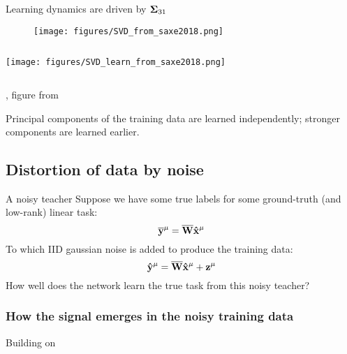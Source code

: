 \documentclass{beamer}
\newcommand{\bb}[1]{{\bf\overline{#1}}}
\newcommand{\bh}[1]{{\bf\hat{#1}}}
\begin{document}
\begin{frame}{Learning dynamics are driven by ${\bf\Sigma}_{31}$}
\begin{figure}
\centering
\texttt{[image: figures/SVD\_from\_saxe2018.png]}
\end{figure}
\begin{columns}
\begin{column}{0.5\textwidth}
\texttt{[image: figures/SVD\_learn\_from\_saxe2018.png]}
\end{column}
\begin{column}{0.5\textwidth}
\centering
{}
\end{column}
\end{columns}
{\footnotesize \citep{Saxe2013}, figure from \citep{Saxe2018}}
\end{frame}

\begin{frame}[standout]
Principal components of the training data are learned independently; stronger components are learned earlier.
\end{frame}

\subsection{Distortion of data by noise}
\begin{frame}{A noisy teacher}
Suppose we have some true labels for some ground-truth (and low-rank) linear task:
$$\bb{y}^{\mu} = \bb{W}\bh{x}^\mu$$
To which IID gaussian noise is added to produce the training data:
$$\bh{y}^{\mu} = \bb{W}\bh{x}^\mu + \bf{z} ^ \mu$$
How well does the network learn the true task from this noisy teacher? 
\end{frame}

\begin{frame}[label=signal_from_noise]
\frametitle{How the signal emerges in the noisy training data}
\vspace{-0.5em}
\begin{center}%
%
%
%
\end{center}
\vspace{-1em}
{\footnotesize Building on \citet{Benaych-Georges2012}}
\end{frame}
\end{document}
